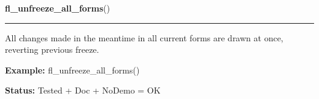     \vspace{0.5ex}

\hspace{.8\funcindent}\begin{boxedminipage}{\funcwidth}

    \raggedright \textbf{fl\_unfreeze\_all\_forms}()

    \vspace{-1.5ex}

    \rule{\textwidth}{0.5\fboxrule}
\setlength{\parskip}{2ex}
    All changes made in the meantime in all current forms are drawn at 
    once, reverting previous freeze.

\setlength{\parskip}{1ex}
\textbf{Example:} fl\_unfreeze\_all\_forms()



\textbf{Status:} Tested + Doc + NoDemo = OK



    \end{boxedminipage}

    \label{xformslib:library:fl_scale_form}

    \vspace{0.5ex}


